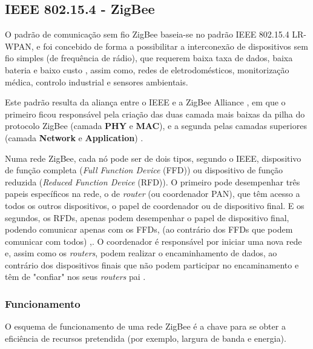 \documentclass[conference]{IEEEtran}
\begin{document}
\subsection{IEEE 802.15.4 - ZigBee}

O padrão de comunicação sem fio ZigBee baseia-se no padrão IEEE 802.15.4 LR-WPAN, e foi concebido de forma a possibilitar a interconexão de dispositivos sem fio simples (de frequência de rádio), que requerem baixa taxa de dados, baixa bateria e baixo custo \cite{kennedy2008review}, assim como, redes de eletrodomésticos, monitorização médica, controlo industrial e sensores ambientais.

Este padrão resulta da aliança entre o IEEE e a ZigBee Alliance , em que o primeiro ficou responsável pela criação das duas camada mais baixas da pilha do protocolo ZigBee (camada \textbf{PHY} e \textbf{MAC}), e a segunda pelas camadas superiores (camada \textbf{Network} e \textbf{Application}) \cite{liang2006impact}.

Numa rede ZigBee, cada nó pode ser de dois tipos, segundo o IEEE, dispositivo de função completa (\textit{Full Function Device} (FFD)) ou dispositivo de função reduzida (\textit{Reduced Function Device} (RFD)).
O primeiro pode desempenhar três papeis específicos na rede, o de \textit{router} (ou coordenador PAN), que têm acesso a todos os outros dispositivos, o papel de coordenador ou de dispositivo final.
E os segundos, os RFDs, apenas podem desempenhar o papel de dispositivo final, podendo comunicar apenas com os FFDs, (ao contrário dos FFDs que podem comunicar com todos) \cite{liang2006impact},\cite{sinem2004zigbee}.
O coordenador é responsável por iniciar uma nova rede e, assim como os \textit{routers}, podem realizar o encaminhamento de dados, ao contrário dos dispositivos finais que não podem participar no encaminamento e têm de "confiar" nos seus \textit{routers} pai \cite{liang2006impact}.


\subsubsection{Funcionamento}


O esquema de funcionamento de uma rede ZigBee é a chave para se obter a eficiência de recursos pretendida (por exemplo, largura de banda e energia).
\end{document}
